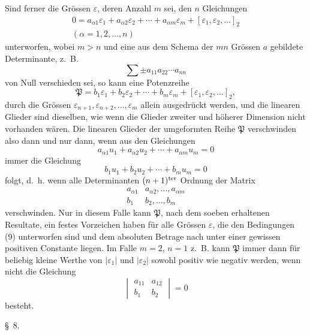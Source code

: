 \documentclass[11pt,a4paper,leqno]{article}
\begin{document}
Sind ferner die Grössen $\varepsilon$, deren Anzahl $m$ sei, den $n$ Gleichungen
\begin{equation}\tag{9}
\begin{gathered}
0=a_{\alpha 1}\varepsilon_1+a_{\alpha 2}\varepsilon_2+\cdots+a_{\alpha m}\varepsilon_m+[\varepsilon_1,\varepsilon_2,\ldots]_2\\
(\alpha=1,2,\ldots,n)
\end{gathered}
\end{equation}
unterworfen, wobei $m>n$ und eine aus dem Schema der $mn$ Grössen $a$ gebildete Determinante, z.~B.
\[
\sum \pm a_{11}a_{22}\cdots a_{nn}
\]
von Null verschieden sei, so kann eine Potenzreihe
\[
\mathfrak{P}=b_1\varepsilon_1+b_2\varepsilon_2+\cdots+b_m\varepsilon_m+[\varepsilon_1,\varepsilon_2,\ldots]_2,
\]
durch die Grössen $\varepsilon_{n+1},\varepsilon_{n+2},\ldots,\varepsilon_m$ allein ausgedrückt werden, und die linearen Glieder sind dieselben, wie wenn die Glieder zweiter und höherer Dimension nicht vorhanden wären. Die linearen Glieder der umgeformten Reihe $\mathfrak{P}$ verschwinden also dann und nur dann, wenn aus den Gleichungen
\[
a_{\alpha1}u_1+a_{\alpha2}u_2+\cdots+a_{\alpha m}u_m=0
\]
immer die Gleichung
\[
b_1u_1+b_2u_2+\cdots+b_mu_m=0
\]
folgt, d.~h. wenn alle Determinanten $(n+1)^{\rm ter}$ Ordnung der Matrix
\[
\begin{matrix}
a_{\alpha1} & a_{\alpha2},\ldots, a_{\alpha m}\\
b_1 & b_2,\ldots, b_m
\end{matrix}
\]
verschwinden. Nur in diesem Falle kann $\mathfrak{P}$, nach dem soeben erhaltenen Resultate, ein festes Vorzeichen haben für alle Grössen $\varepsilon$, die den Bedingungen (9) unterworfen sind und dem absoluten Betrage nach unter einer gewissen positiven Constante liegen. Im Falle $m=2$, $n=1$ z.~B. kann $\mathfrak{P}$ immer dann für beliebig kleine Werthe von $|\varepsilon_1|$ und $|\varepsilon_2|$ sowohl positiv wie negativ werden, wenn nicht die Gleichung
\[
\begin{vmatrix}
a_{11} & a_{12}\\
b_1 & b_2
\end{vmatrix}=0
\]
besteht.

\begin{center}{\large \S~8.}\end{center}
\end{document}
